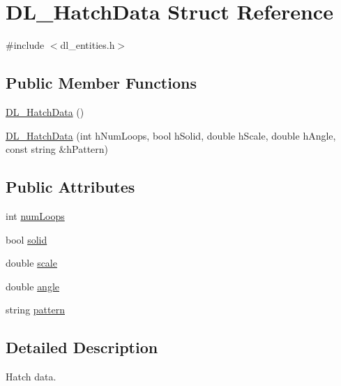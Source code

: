 \hypertarget{structDL__HatchData}{\section{D\-L\-\_\-\-Hatch\-Data Struct Reference}
\label{structDL__HatchData}
}


{\ttfamily \#include $<$dl\-\_\-entities.\-h$>$}

\subsection*{Public Member Functions}
\begin{DoxyCompactItemize}
\item 
\hyperlink{structDL__HatchData_a04160ecd531f41790291f62fae935024}{D\-L\-\_\-\-Hatch\-Data} ()
\item 
\hyperlink{structDL__HatchData_a6cebc158ce8bd1442dfa07a4e3622aa2}{D\-L\-\_\-\-Hatch\-Data} (int h\-Num\-Loops, bool h\-Solid, double h\-Scale, double h\-Angle, const string \&h\-Pattern)
\end{DoxyCompactItemize}
\subsection*{Public Attributes}
\begin{DoxyCompactItemize}
\item 
int \hyperlink{structDL__HatchData_a2632acede38e4a3f7cae7b4adabf6487}{num\-Loops}
\item 
bool \hyperlink{structDL__HatchData_a85079b66124e6a2cee445e898b98d485}{solid}
\item 
double \hyperlink{structDL__HatchData_ad337db248afb78ed45437270ce8428ae}{scale}
\item 
double \hyperlink{structDL__HatchData_affcd2ae51a28b575288215f279ba186f}{angle}
\item 
string \hyperlink{structDL__HatchData_a183c4d897d8ca242caccdb6fb8f352c7}{pattern}
\end{DoxyCompactItemize}


\subsection{Detailed Description}
Hatch data. 

